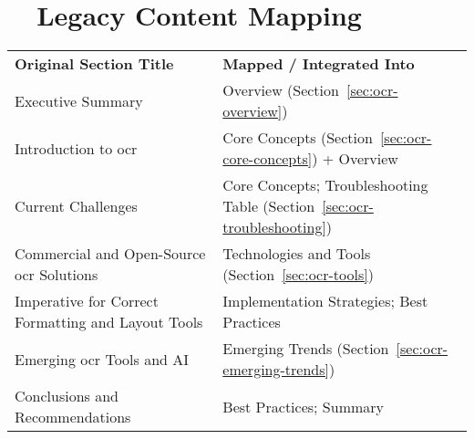 \section{~~Legacy Content Mapping}
\label{sec:ocr-legacy-mapping}
\begin{tabular}{p{} p{}}
	\textbf{Original Section Title}                    & \textbf{Mapped / Integrated Into}                                            \\
	Executive Summary                                  & Overview (Section~\ref{sec:ocr-overview})                                    \\
	Introduction to \gls{ocr}                                & Core Concepts (Section~\ref{sec:ocr-core-concepts}) + Overview               \\
	Current Challenges                                 & Core Concepts; Troubleshooting Table (Section~\ref{sec:ocr-troubleshooting}) \\
	Commercial and Open-Source \gls{ocr} Solutions           & Technologies and Tools (Section~\ref{sec:ocr-tools})                         \\
	Imperative for Correct Formatting and Layout Tools & Implementation Strategies; Best Practices                                    \\
	Emerging \gls{ocr} Tools and AI                          & Emerging Trends (Section~\ref{sec:ocr-emerging-trends})                      \\
	Conclusions and Recommendations                    & Best Practices; Summary                                                      \\
\end{tabular}


